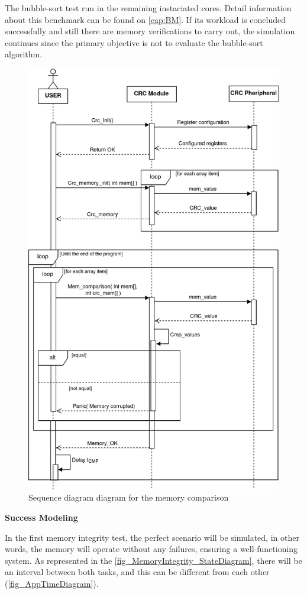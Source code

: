 The bubble-sort test run in the remaining instaciated cores. Detail information about this benchmark can be found on \autoref{cap:BM}.
If its workload is concluded successfully and still there are memory verifications to carry out, the simulation continues since 
the primary objective is not to evaluate the bubble-sort algorithm. 


\begin{figure}[H]
	\centering
 	\includegraphics[width=0.7\linewidth]{Images/MemoryIntegrity_CPU0SequenceDiagram.png}
 	\caption{Sequence diagram diagram for the memory comparison}
	\label{fig_MemoryIntegrity_CPU0SequenceDiagram}
\end{figure}

\textbf{Success Modeling}
\newline

In the first memory integrity test, the perfect scenario will be simulated, in other words, the memory will operate without any failures, 
ensuring a well-functioning system. As represented in the \autoref{fig_MemoryIntegrity_StateDiagram}, there will be an interval between both 
tasks, and this can be different from each other (\ref{fig_AppTimeDiagram}). 

